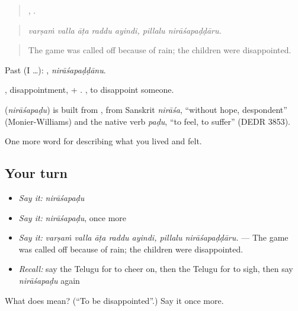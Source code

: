 \begin{quote}
    ,  .
\end{quote}

\begin{quote}
\emph{varṣaṁ valla āṭa raddu ayindi, pillalu nirāśapaḍḍāru.}
\end{quote}

\begin{quote}
The game was called off because of rain; the children were disappointed.
\end{quote}

Past (I …): , \emph{nirāśapaḍḍānu}.

, disappointment, + . , to disappoint someone.

\begin{cousinweb}
\textbf{} (\emph{nirāśapaḍu}) is built from , from Sanskrit \emph{nirāśa}, \textquotedblleft{}without hope, despondent\textquotedblright{} (Monier-Williams) and the native verb \emph{paḍu}, \textquotedblleft{}to feel, to suffer\textquotedblright{} (DEDR 3853).
\end{cousinweb}

\begin{grammarlens}[title={What you've built}]
One more word for describing what you lived and felt.
\end{grammarlens}

\subsection*{Your turn}
\begin{itemize}
\raggedright
  \item \emph{Say it:} \emph{nirāśapaḍu}
  \item \emph{Say it:} \emph{nirāśapaḍu}, once more
  \item \emph{Say it:} \emph{varṣaṁ valla āṭa raddu ayindi, pillalu nirāśapaḍḍāru.} — The game was called off because of rain; the children were disappointed.
  \item \emph{Recall:} say the Telugu for to cheer on, then the Telugu for to sigh, then say \emph{nirāśapaḍu} again
\end{itemize}

\begin{tcolorbox}[breakable,colback=teal!4,colframe=teal!35!black,title={Before you move on}]
What does  mean? (\textquotedblleft{}To be disappointed\textquotedblright{}.) Say it once more.
\end{tcolorbox}
